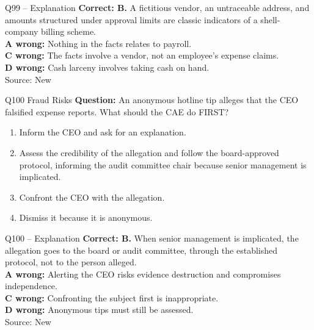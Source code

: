 \documentclass[aspectratio=169,10pt]{beamer}
\begin{document}
\begin{frame}[t]{Q99 -- Explanation}
	\footnotesize
	\textbf{Correct: B.} A fictitious vendor, an untraceable address, and amounts structured under approval limits are classic indicators of a shell-company billing scheme. \\[5pt]
\textbf{A wrong:} Nothing in the facts relates to payroll. \\[3pt]
\textbf{C wrong:} The facts involve a vendor, not an employee's expense claims. \\[3pt]
\textbf{D wrong:} Cash larceny involves taking cash on hand. \\[3pt]
	\vfill {\tiny Source: New}
\end{frame}

\begin{frame}[t]{Q100 \hfill {\scriptsize Fraud Risks}}
	\small
	\textbf{Question:} An anonymous hotline tip alleges that the CEO falsified expense reports. What should the CAE do FIRST?
	\begin{enumerate}[label=\Alph*.,itemsep=1pt,topsep=3pt]
			\item Inform the CEO and ask for an explanation.
			\item Assess the credibility of the allegation and follow the board-approved protocol, informing the audit committee chair because senior management is implicated.
			\item Confront the CEO with the allegation.
			\item Dismiss it because it is anonymous.
	\end{enumerate}
\end{frame}

\begin{frame}[t]{Q100 -- Explanation}
	\footnotesize
	\textbf{Correct: B.} When senior management is implicated, the allegation goes to the board or audit committee, through the established protocol, not to the person alleged. \\[5pt]
\textbf{A wrong:} Alerting the CEO risks evidence destruction and compromises independence. \\[3pt]
\textbf{C wrong:} Confronting the subject first is inappropriate. \\[3pt]
\textbf{D wrong:} Anonymous tips must still be assessed. \\[3pt]
	\vfill {\tiny Source: New}
\end{frame}
\end{document}
